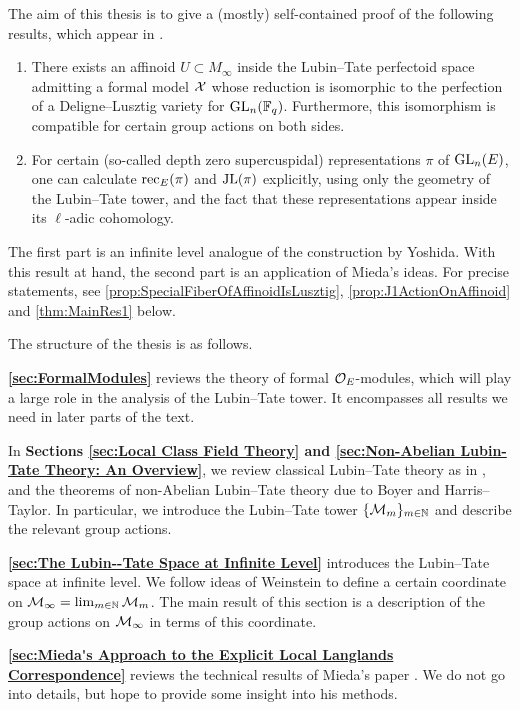 \documentclass[../main.tex]{subfiles}
\begin{document}
The aim of this thesis is to give a (mostly) self-contained proof of
the following results, which appear in \cite[Section 5]{mieda2016geometric}. 
\begin{thm*}
  \leavevmode \begin{enumerate}
    \item There exists an affinoid $U \subset M_\infty$ inside the Lubin--Tate perfectoid
      space admitting a formal model $\mathcal{X}$ whose reduction is isomorphic to the
      perfection of a Deligne--Lusztig variety for $\operatorname{GL}_n(\mathbb{F}_q)$. Furthermore,
      this isomorphism is compatible for certain group actions on both sides.
    \item For certain (so-called depth zero supercuspidal) representations
      $\pi$ of $\operatorname{GL}_n(E)$, one can calculate $\mathrm{rec}_E(\pi)$ and $\mathrm{JL}(\pi)$
      explicitly, using only the geometry of the Lubin--Tate tower, and the
      fact that these representations appear inside its $\ell$-adic cohomology.
  \end{enumerate}
\end{thm*}
The first part is an infinite level analogue of the construction by Yoshida.
With this result at hand, the second part is an application of Mieda's ideas.
For precise statements, see \cref{prop:SpecialFiberOfAffinoidIsLusztig},
\cref{prop:J1ActionOnAffinoid} and \cref{thm:MainRes1} below. 

The structure of the thesis is as follows.

\textbf{\cref{sec:FormalModules}} reviews the theory of formal $\mathcal{O}_E$-modules, which
will play a large role in the analysis of the Lubin--Tate tower. It encompasses
all results we need in later parts of the text.

In \textbf{Sections \ref{sec:Local Class Field Theory}  and \ref{sec:Non-Abelian Lubin-Tate Theory: An Overview}}, we review classical Lubin--Tate theory as in
\cite{LubinTateFormalMult}, and the theorems of non-Abelian Lubin--Tate theory
due to Boyer and Harris--Taylor. In particular,
we introduce the Lubin--Tate tower $\{\mathcal{M}_m\}_{m \in \mathbb{N}}$ and describe the
relevant group actions.

\textbf{\cref{sec:The Lubin--Tate Space at Infinite Level}} introduces the
Lubin--Tate space at infinite level. 
We follow ideas of Weinstein to define a certain coordinate on $\mathcal{M}_\infty = 
\lim_{m \in \mathbb{N}} \mathcal{M}_m$. The main result of this section is a description of
the group actions on $\mathcal{M}_\infty$ in terms of this coordinate. 

\textbf{\cref{sec:Mieda's Approach to the Explicit Local Langlands
Correspondence}} reviews the technical results of Mieda's paper
\cite{mieda2016geometric}. We do not go into details, but hope to provide some
insight into his methods. 
\end{document}
